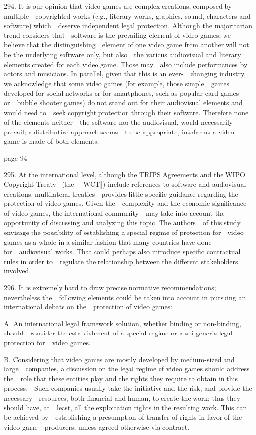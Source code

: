\documentclass[
]{article}
\begin{document}
{294. }{It is our opinion that video games are complex creations,
composed by multiple~~copyrighted works (e.g., literary works, graphics,
sound, characters and software) which~~deserve independent legal
protection. Although the majoritarian trend considers that~~software is
the prevailing element of video games, we believe that the
distinguishing~~element of one video game from another will not be the
underlying software only, but also~~the various audiovisual and literary
elements created for each video game. Those may~~also include
performances by actors and musicians. In parallel, given that this is an
ever-~~changing industry, we acknowledge that some video games (for
example, those simple~~games developed for social networks or for
}{smartphones}{, such as popular card games or~~bubble shooter games) do
not stand out for their audiovisual elements and would need to~~seek
copyright protection through their software. Therefore none of the
elements neither~~the software nor the audiovisual, would necessarily
prevail; a distributive approach seems~~to be appropriate, insofar as a
video game is made of both elements.}

{page 94}

{295. }{At the international level, although the TRIPS Agreements and
the WIPO Copyright Treaty }{~(the ―WCT‖) include references to software
and audiovisual creati}{ons, multilateral treaties~~provides little
specific guidance regarding the protection of video games. Given
the~~complexity and the economic significance of video games, the
international community~~may take into account the opportunity of
discussing and analyzing this topic. The authors~~of this study envisage
the possibility of establishing a special regime of protection
for~~video games as a whole in a similar fashion that many countries
have done for~~audiovisual works. That could perhaps also introduce
specific contractual rules in order to~~regulate the relationship
between the different stakeholders involved.}

{296. }{It is extremely hard to draw precise normative recommendations;
nevertheless the~~following elements could be taken into account in
pursuing an international debate on the~~protection of video games:}

{A. An international legal framework solution, whether binding or
non-binding, should~~consider the establishment of a special regime or a
}{sui generis }{legal protection for~~video games.}

{B. Considering that video games are mostly developed by medium-sized
and large~~companies, a discussion on the legal regime of video games
should address the~~role that these entities play and the rights they
require to obtain in this process.~~Such companies usually take the
initiative and the risk, and provide the necessary~~resources, both
financial and human, to create the work; thus they should have,
at~~least, all the exploitation rights in the resulting work. This can
be achieved by~~establishing a presumption of transfer of rights in
favor of the video game~~producers, unless agreed otherwise via
contract.}
\end{document}
